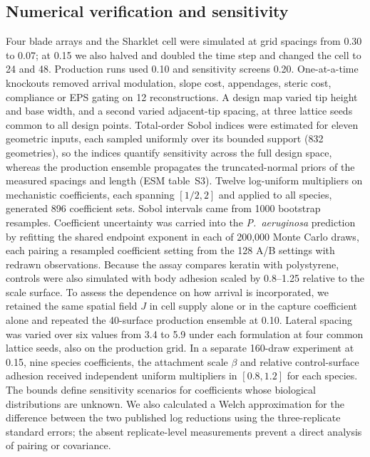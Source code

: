 \documentclass[11pt]{article}
\newcommand{\Pa}{\textit{P.~aeruginosa}}
\begin{document}
\subsection{Numerical verification and sensitivity}
Four blade arrays and the Sharklet cell were simulated at grid spacings from 0.30 to \SI{0.07}{\micrometre}; at \SI{0.15}{\micrometre} we also halved and doubled the time step and changed the cell to 24 and \SI{48}{\micrometre}. Production runs used \SI{0.10}{\micrometre} and sensitivity screens \SI{0.20}{\micrometre}. One-at-a-time knockouts removed arrival modulation, slope cost, appendages, steric cost, compliance or EPS gating on 12 reconstructions. A design map varied tip height and base width, and a second varied adjacent-tip spacing, at three lattice seeds common to all design points. Total-order Sobol indices \cite{Saltelli2010} were estimated for eleven geometric inputs, each sampled uniformly over its bounded support (832 geometries), so the indices quantify sensitivity across the full design space, whereas the production ensemble propagates the truncated-normal priors of the measured spacings and length (ESM table~S3). Twelve log-uniform multipliers on mechanistic coefficients, each spanning $[1/2,2]$ and applied to all species, generated 896 coefficient sets. Sobol intervals came from 1000 bootstrap resamples. Coefficient uncertainty was carried into the \Pa{} prediction by refitting the shared endpoint exponent in each of 200,000 Monte Carlo draws, each pairing a resampled coefficient setting from the 128 A/B settings with redrawn observations. Because the assay compares keratin with polystyrene, controls were also simulated with body adhesion scaled by 0.8--1.25 relative to the scale surface. To assess the dependence on how arrival is incorporated, we retained the same spatial field $J$ in cell supply alone or in the capture coefficient alone and repeated the 40-surface production ensemble at \SI{0.10}{\micrometre}. Lateral spacing was varied over six values from 3.4 to \SI{5.9}{\micrometre} under each formulation at four common lattice seeds, also on the production grid. In a separate 160-draw experiment at \SI{0.15}{\micrometre}, nine species coefficients, the attachment scale $\beta$ and relative control-surface adhesion received independent uniform multipliers in $[0.8,1.2]$ for each species. The bounds define sensitivity scenarios for coefficients whose biological distributions are unknown. We also calculated a Welch approximation for the difference between the two published log reductions using the three-replicate standard errors; the absent replicate-level measurements prevent a direct analysis of pairing or covariance.
\end{document}
